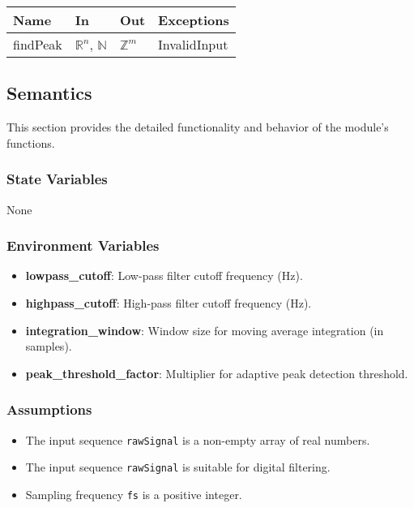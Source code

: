 \documentclass[12pt, titlepage]{article}
\begin{document}
\begin{center}
\begin{tabular}{p{2.5cm} p{4.5cm} p{4.5cm} p{2.5cm}}
\hline
\textbf{Name} & \textbf{In} & \textbf{Out} & \textbf{Exceptions} \\
\hline
findPeak & $\mathbb{R}^n$, $\mathbb{N}$ & $\mathbb{Z}^m$ & InvalidInput \\
\hline
\end{tabular}
\end{center}

\subsection{Semantics}

This section provides the detailed functionality and behavior of the module’s
functions.

\subsubsection{State Variables}

None

\subsubsection{Environment Variables}

\begin{itemize}
\item \textbf{lowpass\_cutoff}: Low-pass filter cutoff frequency (Hz).
\item \textbf{highpass\_cutoff}: High-pass filter cutoff frequency (Hz).
\item \textbf{integration\_window}: Window size for moving average integration
(in samples).
\item \textbf{peak\_threshold\_factor}: Multiplier for adaptive peak detection
threshold.
\end{itemize}

\subsubsection{Assumptions}

\begin{itemize}
\item The input sequence \texttt{rawSignal} is a non-empty array of real
numbers.
\item The input sequence \texttt{rawSignal} is suitable for digital filtering.
\item Sampling frequency \texttt{fs} is a positive integer.
\end{itemize}
\end{document}
